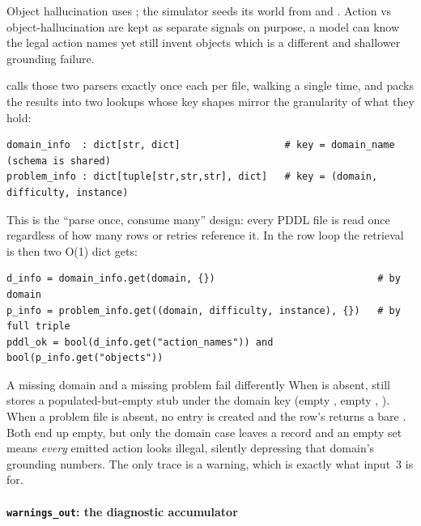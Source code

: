 Object hallucination uses ; the simulator seeds its world from
 and . Action vs object-hallucination are
kept as separate signals on purpose, a model can know the legal action names
yet still invent objects which is a different and shallower grounding failure.

 calls those two parsers exactly once each
per file, walking  a single time, and packs the results into two
lookups whose key shapes mirror the granularity of what they hold:

\begin{lstlisting}
domain_info  : dict[str, dict]                  # key = domain_name  (schema is shared)
problem_info : dict[tuple[str,str,str], dict]   # key = (domain, difficulty, instance)
\end{lstlisting}

This is the ``parse once, consume many'' design: every PDDL file is read once
regardless of how many rows or retries reference it. In the row loop the
retrieval is then two O(1) dict gets:

\begin{lstlisting}
d_info = domain_info.get(domain, {})                            # by domain
p_info = problem_info.get((domain, difficulty, instance), {})   # by full triple
pddl_ok = bool(d_info.get("action_names")) and bool(p_info.get("objects"))
\end{lstlisting}

\begin{bmcavbox}{A missing domain and a missing problem fail differently}
When  is absent,  still stores a
populated-but-empty stub under the domain key (empty , empty
, ). When a problem file is absent, no entry is
created and the row's  returns a bare \code{\{\}}. 
Both end up empty, but only the domain case leaves a record and an empty  set means \emph{every} emitted action looks illegal,
silently depressing that domain's grounding numbers. The only trace is a warning, which is exactly what input~3 is for.
\end{bmcavbox}

\paragraph{\texorpdfstring{\texttt{warnings\_out}}{warnings\_out}: the diagnostic accumulator}

